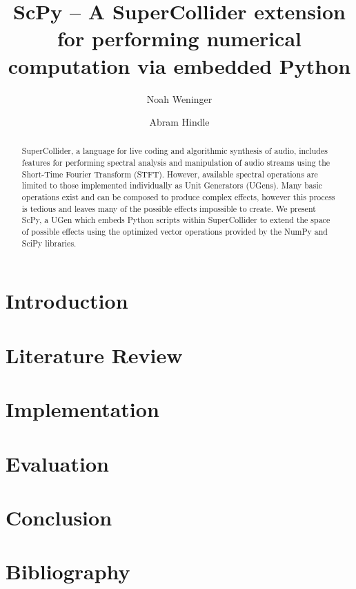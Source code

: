 \documentclass{article}
\begin{document}
\title{ScPy -- A SuperCollider extension for performing numerical computation via embedded Python}
\author{Noah Weninger \and Abram Hindle}

\maketitle

\begin{abstract}
    SuperCollider, a language for live coding and algorithmic synthesis of audio,
    includes features for performing spectral analysis and manipulation of audio streams using the
    Short-Time Fourier Transform (STFT). However, available spectral operations are limited to those
    implemented individually as Unit Generators (UGens). Many basic operations exist and can be
    composed to produce complex effects, however this process is tedious and leaves many of the
    possible effects impossible to create. We present ScPy, a UGen which embeds Python scripts within
    SuperCollider to extend the space of possible effects using the optimized vector operations
    provided by the NumPy and SciPy libraries.
\end{abstract}

\section{Introduction}

\section{Literature Review}

\section{Implementation}

\section{Evaluation}

\section{Conclusion}

\section{Bibliography}
\end{document}
